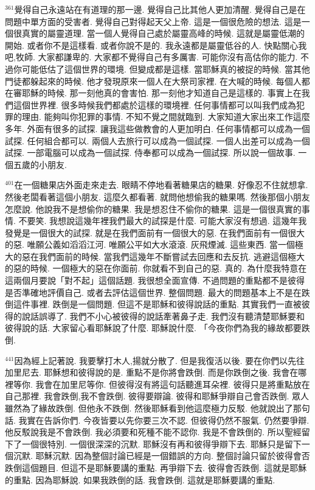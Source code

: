 \documentclass{book}
\begin{document}
$^{361}$覺得自己永遠站在有道理的那一邊.
覺得自己比其他人更加清醒.
覺得自己是在問題中單方面的受害者.
覺得自己對得起天父上帝.
這是一個很危險的想法.
這是一個很真實的屬靈道理.
當一個人覺得自己處於屬靈高峰的時候.
這就是屬靈低潮的開始.
或者你不是這樣看.
或者你說不是的.
我永遠都是屬靈低谷的人.
快點關心我吧,牧師.
大家都謙卑的.
大家都不覺得自己有多厲害.
可能你沒有高估你的能力.
不過你可能低估了這個世界的環境.
但變成都是這樣.
當耶穌真的被捉的時候.
當其他門徒都躲起來的時候.
他才發現原來一個人在大祭司家裡.
在大喊的時候.
每個人都在審耶穌的時候.
那一刻他真的會害怕.
那一刻他才知道自己是這樣的.
事實上在我們這個世界裡.
很多時候我們都處於這樣的環境裡.
任何事情都可以叫我們成為犯罪的理由.
能夠叫你犯罪的事情.
不知不覺之間就臨到.
大家知道大家出來工作這麼多年.
外面有很多的試探.
讓我這些做教會的人更加明白.
任何事情都可以成為一個試探.
任何組合都可以.
兩個人去旅行可以成為一個試探.
一個人出差可以成為一個試探.
一部電腦可以成為一個試探.
侍奉都可以成為一個試探.
所以說一個故事.
一個五歲的小朋友.

$^{401}$在一個糖果店外面走來走去.
眼睛不停地看著糖果店的糖果.
好像忍不住就想拿.
然後老闆看著這個小朋友.
這麼久都看著.
就問他想偷我的糖果嗎.
然後那個小朋友怎麼說.
他說我不是想偷你的糖果.
我是想忍住不偷你的糖果.
這是一個很真實的事情.
不要笑.
我想說這幾年裡我們最大的試探是什麼.
可能大家沒有想過.
這幾年我發覺是一個很大的試探.
就是在我們面前有一個很大的惡.
在我們面前有一個很大的惡.
唯願公義如滔滔江河.
唯願公平如大水滾滾.
灰飛煙滅.
這些東西.
當一個極大的惡在我們面前的時候.
當我們這幾年不斷嘗試去回應和去反抗.
逃避這個極大的惡的時候.
一個極大的惡在你面前.
你就看不到自己的惡.
真的.
為什麼我特意在這兩個月要說「對不起」這個話題.
我很想全面宣傳.
不過問題的重點都不是彼得是否準確地評價自己.
或者去評估這個世界.
整個問題.
最大的問題基本上不是在跌倒這件事裡.
跌倒是一個問題.
但這不是耶穌和彼得說話的重點.
其實我們一直被彼得的說話誤導了.
我們不小心被彼得的說話牽著鼻子走.
我們沒有聽清楚耶穌要和彼得說的話.
大家留心看耶穌說了什麼.
耶穌說什麼.
「今夜你們為我的緣故都要跌倒.

$^{441}$因為經上記著說.
我要擊打木人,揚就分散了.
但是我復活以後.
要在你們以先往加里尼去.
耶穌想和彼得說的是.
重點不是你將會跌倒.
而是你跌倒之後.
我會在哪裡等你.
我會在加里尼等你.
但彼得沒有將這句話聽進耳朵裡.
彼得只是將重點放在自己那裡.
我會跌倒,我不會跌倒.
彼得要辯論.
彼得和耶穌爭辯自己會否跌倒.
眾人雖然為了緣故跌倒.
但他永不跌倒.
然後耶穌看到他這麼極力反駁.
他就說出了那句話.
我實在告訴你們.
今夜皆要以先你要三次不認.
但彼得仍然不服氣.
仍然要爭辯.
他反駁說我是不會跌倒.
我必須要和死種不能不認你.
我是不會跌倒的.
所以聖經留下了一個很特別.
一個很深深的沉默.
耶穌沒有再和彼得爭辯下去.
耶穌只是留下一個沉默.
耶穌沉默.
因為整個討論已經是一個錯誤的方向.
整個討論只留於彼得會否跌倒這個題目.
但這不是耶穌要講的重點.
再爭辯下去.
彼得會否跌倒.
這就是耶穌的重點.
因為耶穌說.
如果我跌倒的話.
我會跌倒.
這就是耶穌要講的重點.
\end{document}
